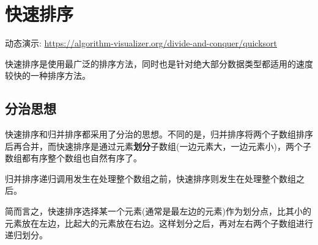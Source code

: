 \section{快速排序}

动态演示: \url{https://algorithm-visualizer.org/divide-and-conquer/quicksort}

快速排序是使用最广泛的排序方法，同时也是针对绝大部分数据类型都适用的速度较快的一种排序方法。

\subsection{分治思想}

快速排序和归并排序都采用了分治的思想。不同的是，归并排序将两个子数组排序后再合并，而快速排序是通过元素\textbf{划分}子数组(一边元素大，一边元素小)，两个子数组都有序整个数组也自然有序了。

归并排序递归调用发生在处理整个数组之前，快速排序则发生在处理整个数组之后。

简而言之，快速排序选择某一个元素(通常是最左边的元素)作为划分点，比其小的元素放在左边，比起大的元素放在右边。这样划分之后，再对左右两个子数组进行递归划分。

